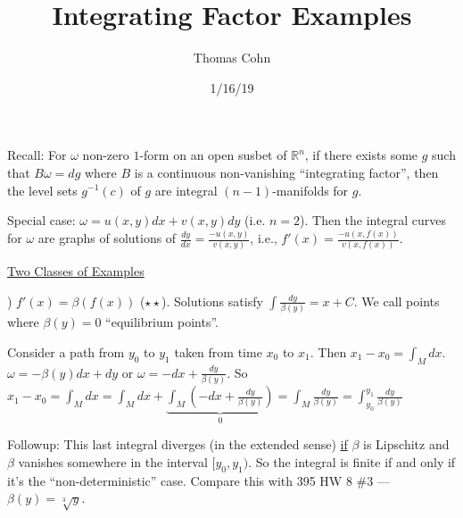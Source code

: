 \documentclass[10pt,letterpaper]{article}
\author{Thomas Cohn}
\title{Integrating Factor Examples}
\date{1/16/19} %
\newcommand{\n}{\hfill\break}
\newcommand{\reals}{\mathbb{R}}
\newcommand{\R}{\reals}
\newcommand{\inv}{^{-1}}
\newcommand{\paren}[1]{\left(#1\right)}
\begin{document}
\maketitle
\setlength\RaggedRightParindent{\parindent}
\RaggedRight

\par\noindent Recall: For $\omega$ non-zero $1$-form on an open susbet of $\R^{n}$, if there exists some $g$ such that $B\omega=dg$ where $B$ is a continuous non-vanishing ``integrating factor'', then the level sets $g\inv(c)$ of $g$ are integral $(n-1)$-manifolds for $g$.\n

\par\noindent Special case: $\omega=u(x,y)dx+v(x,y)dy$ (i.e. $n=2$).\n
Then the integral curves for $\omega$ are graphs of solutions of $\frac{dy}{dx}=\frac{-u(x,y)}{v(x,y)}$, i.e., $f'(x)=\frac{-u(x,f(x))}{v(x,f(x))}$.\n

\par\noindent\underline{Two Classes of Examples}\n

\par{}) $f'(x)=\beta(f(x))$ ($\star\star$). Solutions satisfy $\int\frac{dy}{\beta(y)}=x+C$.\n
We call points where $\beta(y)=0$ ``equilibrium points''.\n

\par\noindent Consider a path from $y_{0}$ to $y_{1}$ taken from time $x_{0}$ to $x_{1}$. Then $x_{1}-x_{0}=\int_{M}dx$.\n
$\omega=-\beta(y)dx+dy$ or $\omega=-dx+\frac{dy}{\beta(y)}$.\n
So $\displaystyle x_{1}-x_{0}=\int_{M}dx=\int_{M}dx+\underbrace{\int_{M}\paren{-dx+\frac{dy}{\beta(y)}}}_{0}=\int_{M}\frac{dy}{\beta(y)}=\int_{y_{0}}^{y_{1}}\frac{dy}{\beta(y)}$\n

\par\noindent Followup: This last integral diverges (in the extended sense) \underline{if} $\beta$ is Lipschitz and $\beta$ vanishes somewhere in the interval $[y_{0},y_{1})$. So the integral is finite if and only if it's the ``non-deterministic'' case. Compare this with 395 HW 8 \#3 --- $\beta(y)=\sqrt[3]{y}$.\n
\end{document}
